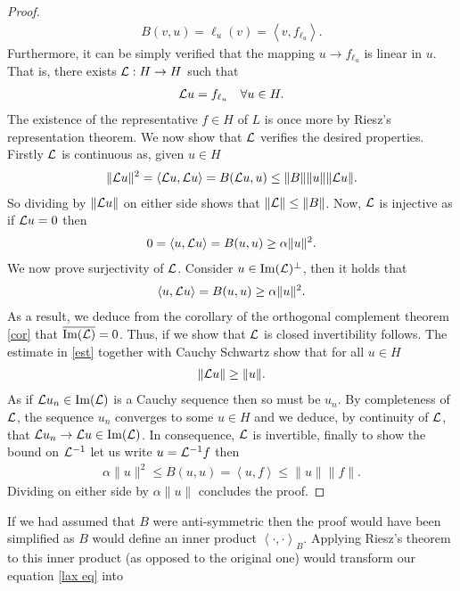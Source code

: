 \documentclass[12pt]{article}
\newcommand{\br}[1]{\left\langle#1\right\rangle} \newcommand{\set}[1]{\left\{#1\right\}}\newcommand{\qt}[1]{\left(#1\right)} \newcommand{\qp}[1]{\left(#1\right)}\newcommand{\qb}[1]{\left[#1\right]}
\renewcommand{\norm}[1]{\lVert #1 \rVert}\renewcommand{\abs}[1]{\left| #1 \right|}
\begin{document}
\begin{CJK*}{UTF8}{gbsn}
\begin{proof}
		\begin{align}\label{f}
			B(v,u)= \ell _u(v)= \br{v, f_{\ell _u}} .
		\end{align}
		Furthermore, it can be simply verified that the mapping $u \to f_{\ell _u}$ is linear in $u$. That is, there exists $\mathcal{L}: H\to H$ such that
		\begin{align}\label{g}
			\mathcal{L} u =f_{\ell _u} \quad\forall  u \in H.
		\end{align}
		The existence of the representative  $f \in  H$ of $L$ is once more by Riesz's representation theorem. We now show that $\mathcal{L}$ verifies the desired properties. Firstly $\mathcal{L}$ is continuous as, given $u\in  H$ \begin{align*}
			\norm{\Ll u}^2=\br{\Ll u,  \Ll u}=B(\Ll u, u)\leq \norm{B} \norm{u}\norm{ \Ll u}.
		\end{align*}
		So dividing by $\norm{\Ll u}$ on either side shows that $\norm{\Ll} \leq \norm{B}$. Now, $\mathcal{L}$ is
		injective as if $ \mathcal{L} u=0$ then
		\begin{align*}
			0=\br{u, \Ll u}= B(u,u) \geq \alpha \norm{u}^2 .
		\end{align*}
		We now prove surjectivity of $\mathcal{L}$. Consider  $ u \in  \Im(\mathcal{L})^\perp$, then it holds that
		\begin{align}\label{est}
			\br{u, \Ll u}= B(u,u)\geq \alpha \norm{u}^2.
		\end{align}
		As a result, we deduce from the corollary of the orthogonal complement theorem \ref{cor} that $\overline{\Im(\mathcal{L})}=0$. Thus, if we show that $\mathcal{L}$ is closed invertibility follows. The estimate in \eqref{est} together with Cauchy Schwartz show that for all $u \in H$
		\begin{align*}
			\norm{ \Ll u}\geq \norm{u}.
		\end{align*}
		As if $ \mathcal{L} u_n \in  \Im (\mathcal{L})$ is a Cauchy sequence then so must be $u_n$. By completeness of  $\mathcal{L}$, the sequence  $u_n$ converges to some  $u \in  H$ and we deduce, by continuity of $\mathcal{L}$,
		that $ \mathcal{L} u_n \to \mathcal{L} u \in \Im (\mathcal{L})$. In consequence, $\mathcal{L}$ is invertible, finally to show the bound on $\mathcal{L}^{-1}$ let us write $u =\mathcal{L}^{-1} f$ then
		\begin{align*}
			\alpha \norm{u}^2 \leq B(u,u) = \br{u,f}\leq \norm{u}\norm{f} .
		\end{align*}
		Dividing on either side by $\alpha \norm{u}$ concludes the proof.
	\end{proof}
	If we had assumed that $B$ were anti-symmetric then the proof would have been simplified as $B$ would define an inner product  $\br{\cdot ,\cdot }_B$. Applying Riesz's theorem to this inner product (as opposed to the original one) would transform our equation \eqref{lax eq} into

\end{CJK*}
\end{document}
